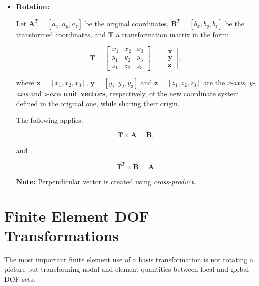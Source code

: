 \begin{itemize}
    \item \textbf{Rotation:}

        Let $\mathbf{A}^{T} = [a_{x}, a_{y}, a_{z}]$ be the original coordinates,
        $\mathbf{B}^{T} = [b_{x}, b_{y}, b_{z}]$ be the transformed coordinates, and
        $\mathbf{T}$ a transformation matrix in the form:

        \begin{equation}
            \mathbf{T} = \begin{bmatrix}
                x_1 & x_2 & x_3 \\
                y_1 & y_2 & y_3 \\
                z_1 & z_2 & z_3
            \end{bmatrix} = \begin{bmatrix}
                \mathbf{x} \\
                \mathbf{y} \\
                \mathbf{z}
            \end{bmatrix}
        ,\end{equation}

        where $\mathbf{x} = [x_1, x_2, x_3]$, $\mathbf{y} = [y_1, y_2, y_3]$ and
        $\mathbf{z} = [z_1, z_2, z_3]$ are the \textit{x-axis}, \textit{y-axis} and
        \textit{z-axis} \textbf{unit vectors}, respectively, of the new coordinate
        system defined in the original one, while sharing their origin.

        The following applies:

        \begin{equation}
            \mathbf{T} \times \mathbf{A} = \mathbf{B}
        ,\end{equation}

        and

        \begin{equation}
            \mathbf{T}^{T} \times \mathbf{B} = \mathbf{A}
        .\end{equation}

        \textbf{Note:} Perpendicular vector is  created using \textit{cross-product}.
\end{itemize}


\section{Finite Element DOF Transformations}

The most important finite element use of a basis transformation is not rotating a
picture but transforming nodal and element quantities between local and global
DOF sets.

